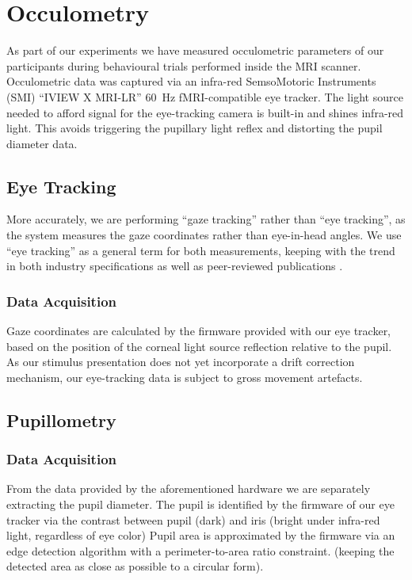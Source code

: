     \section{Occulometry}\label{sec:m_om}
	As part of our experiments we have measured occulometric parameters of our participants during behavioural trials performed inside the MRI scanner.
	Occulometric data was captured via an infra-red SemsoMotoric Instruments (SMI) “IVIEW X\textsuperscript{\small\texttrademark} MRI-LR” \SI{60}{\hertz} fMRI-compatible eye tracker.
	The light source needed to afford signal for the eye-tracking camera is built-in and shines infra-red light.
	This avoids triggering the pupillary light reflex \citep{Ellis1981} and distorting the pupil diameter data.

	\subsection{Eye Tracking}\label{sec:m_om_et}
	    More accurately, we are performing “gaze tracking” rather than “eye tracking”, as the system measures the gaze coordinates rather than eye-in-head angles.
	    We use “eye tracking” as a general term for both measurements, keeping with the trend in both industry specifications \citep{Bojko2006} as well as peer-reviewed publications \citep{Kirk2013}.
	    
	    \subsubsection{Data Acquisition}
		Gaze coordinates are calculated by the firmware provided with our eye tracker, based on the position of the corneal light source reflection relative to the pupil.
		As our stimulus presentation does not yet incorporate a drift correction mechanism, our eye-tracking data is subject to gross movement artefacts.

	\subsection{Pupillometry}\label{sec:m_om_pm}
	    \subsubsection{Data Acquisition}
		From the data provided by the aforementioned hardware we are separately extracting the pupil diameter.
		The pupil is identified by the firmware of our eye tracker via the contrast between pupil (dark) and iris (bright under infra-red light, regardless of eye color)
		Pupil area is approximated by the firmware via an edge detection algorithm with a perimeter-to-area ratio constraint.
		(keeping the detected area as close as possible to a circular form).

